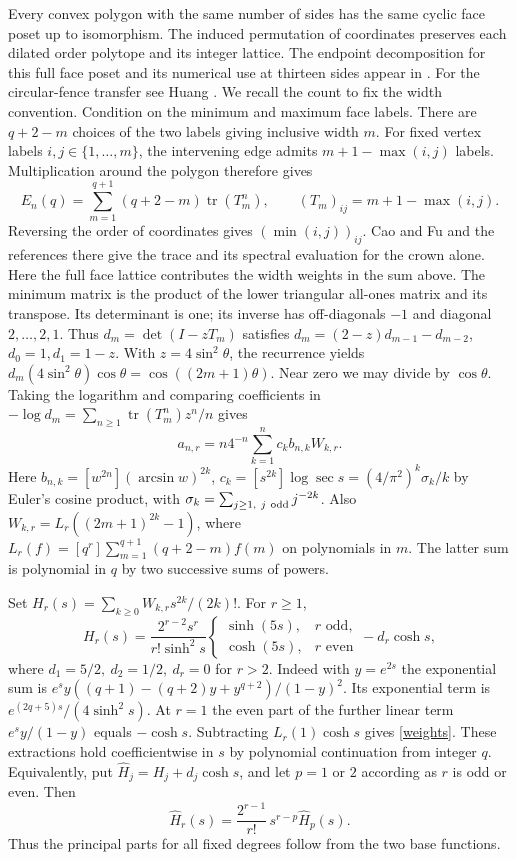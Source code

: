 \documentclass[11pt]{article}
\newcommand{\tr}{\operatorname{tr}}
\begin{document}
Every convex polygon with the same number of sides has the same cyclic face poset up to isomorphism. The induced permutation of coordinates preserves each dilated order polytope and its integer lattice. The endpoint decomposition for this full face poset and its numerical use
at thirteen sides appear in \cite{catalog,patel}. For the circular-fence
transfer see Huang \cite[Proposition 4.1]{huang}. We recall the count to
fix the width convention. Condition on the minimum and maximum face labels. There are \(q+2-m\)
choices of the two labels giving inclusive width \(m\). For fixed vertex
labels \(i,j\in\{1,\ldots,m\}\), the intervening edge admits
\(m+1-\max(i,j)\) labels. Multiplication around the polygon therefore gives
\[
 E_n(q)=\sum_{m=1}^{q+1}(q+2-m)\tr(T_m^n),\qquad
 (T_m)_{ij}=m+1-\max(i,j).
\]
Reversing the order of coordinates gives \((\min(i,j))_{ij}\).
Cao and Fu \cite[Proposition 3.1]{cao} and the references there give
the trace and its spectral evaluation for the crown alone.
Here the full face lattice contributes the width weights in the sum above.
The minimum matrix is the product of the lower triangular all-ones matrix
and its transpose. Its
determinant is one; its inverse has off-diagonals \(-1\) and diagonal
\(2,\ldots,2,1\). Thus \(d_m=\det(I-zT_m)\) satisfies
\(d_m=(2-z)d_{m-1}-d_{m-2}\), \(d_0=1,d_1=1-z\).
With \(z=4\sin^2\theta\), the recurrence yields
\(d_m(4\sin^2\theta)\cos\theta=\cos((2m+1)\theta)\). Near zero we may divide by \(\cos\theta\).
Taking the logarithm and comparing coefficients in
\(-\log d_m=\sum_{n\ge1}\tr(T_m^n)z^n/n\) gives
\begin{equation}\label{trace}
 a_{n,r}=n4^{-n}\sum_{k=1}^n c_k b_{n,k}W_{k,r}.
\end{equation}
Here \(b_{n,k}=[w^{2n}](\arcsin w)^{2k}\),
\(c_k=[s^{2k}]\log\sec s=(4/\pi^2)^k\sigma_k/k\) by Euler's cosine
product, with \(\sigma_k=\sum_{j\ge1,\ j\ {\rm odd}}j^{-2k}\).
Also \(W_{k,r}=L_r((2m+1)^{2k}-1)\), where
\(L_r(f)=[q^r]\sum_{m=1}^{q+1}(q+2-m)f(m)\) on polynomials in \(m\).
The latter sum is polynomial in \(q\) by two successive sums of powers.

Set \(H_r(s)=\sum_{k\ge0}W_{k,r}s^{2k}/(2k)!\). For \(r\ge1\),
\begin{equation}\label{weights}
 H_r(s)=\frac{2^{r-2}s^r}{r!\sinh^2 s}
 \begin{cases}\sinh(5s),&r\text{ odd},\\ \cosh(5s),&r\text{ even}\end{cases}
 -d_r\cosh s ,
\end{equation}
where \(d_1=5/2,\ d_2=1/2,\ d_r=0\) for \(r>2\).
Indeed with \(y=e^{2s}\) the exponential sum is
\(e^s y((q+1)-(q+2)y+y^{q+2})/(1-y)^2\). Its exponential term is
\(e^{(2q+5)s}/(4\sinh^2s)\). At \(r=1\) the even part of the further
linear term \(e^s y/(1-y)\) equals \(-\cosh s\).
Subtracting \(L_r(1)\cosh s\) gives \eqref{weights}. These extractions
hold coefficientwise in \(s\) by polynomial continuation from integer \(q\).
Equivalently, put \(\widehat H_j=H_j+d_j\cosh s\), and let \(p=1\)
or \(2\) according as \(r\) is odd or even. Then
\[
 \widehat H_r(s)=\frac{2^{r-1}}{r!}\,s^{r-p}\widehat H_p(s).
\]
Thus the principal parts for all fixed degrees follow from the two
base functions.
\end{document}
